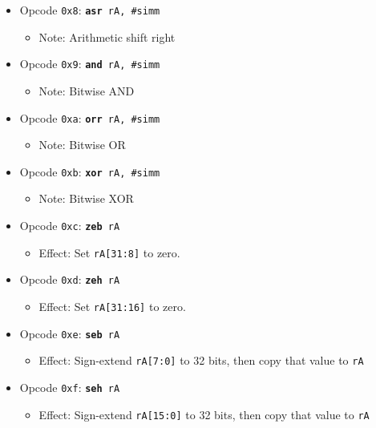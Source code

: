 \documentclass{article}
\begin{document}
\begin{itemize}
\begin{itemize}
		\end{itemize}
		\item Opcode \texttt{0x8}:
			\texttt{\textbf{asr} rA, \#simm}
		\begin{itemize}
			\item Note:  Arithmetic shift right
		\end{itemize}
		\item Opcode \texttt{0x9}:
			\texttt{\textbf{and} rA, \#simm}
		\begin{itemize}
			\item Note:  Bitwise AND
		\end{itemize}
		\item Opcode \texttt{0xa}:
			\texttt{\textbf{orr} rA, \#simm}
		\begin{itemize}
			\item Note:  Bitwise OR
		\end{itemize}
		\item Opcode \texttt{0xb}:
			\texttt{\textbf{xor} rA, \#simm}
		\begin{itemize}
			\item Note:  Bitwise XOR
		\end{itemize}
		\item Opcode \texttt{0xc}:
			\texttt{\textbf{zeb} rA}
		\begin{itemize}
			\item Effect:  Set \texttt{rA[31:8]} to zero.
		\end{itemize}
		\item Opcode \texttt{0xd}:
			\texttt{\textbf{zeh} rA}
		\begin{itemize}
			\item Effect:  Set \texttt{rA[31:16]} to zero.
		\end{itemize}
		\item Opcode \texttt{0xe}:
			\texttt{\textbf{seb} rA}
		\begin{itemize}
			\item Effect:
				Sign-extend \texttt{rA[7:0]} to 32 bits, then copy that
				value to \texttt{rA}
		\end{itemize}
		\item Opcode \texttt{0xf}:
			\texttt{\textbf{seh} rA}
		\begin{itemize}
			\item Effect:
				Sign-extend \texttt{rA[15:0]} to 32 bits, then copy that
				value to \texttt{rA}
		\end{itemize}
	\end{itemize}
\end{document}
